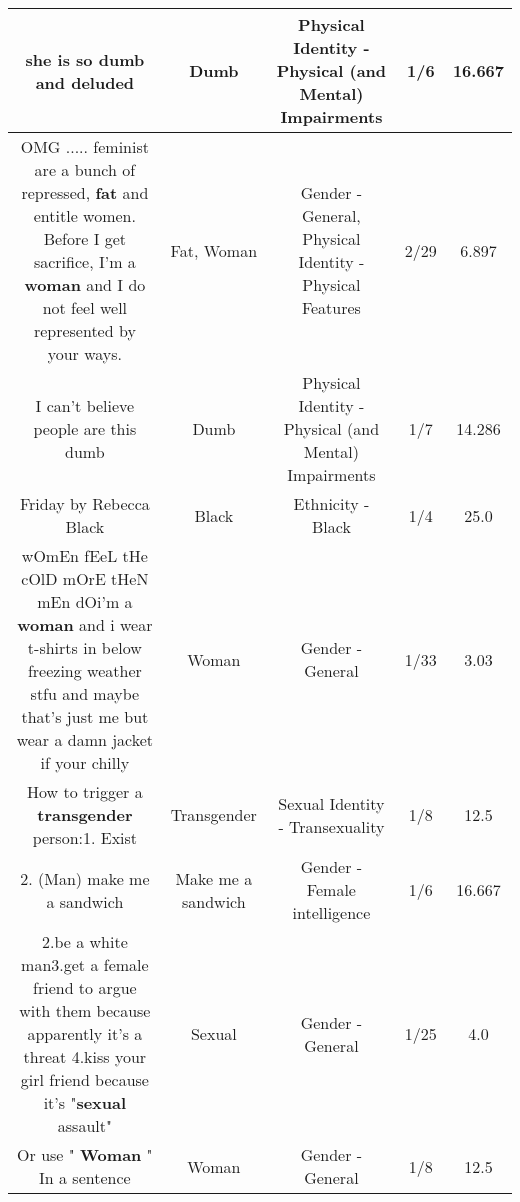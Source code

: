 \documentclass[11pt]{article}
\newlength\mylength
\begin{document}
\begin{center}
\begin{longtable}{|C{.65\mylength}|C{.30\mylength}|C{.12\mylength}|C{.12\mylength}|C{.12\mylength}|}
  \small she is so \textbf{dumb} and deluded\normalsize   & Dumb & Physical Identity - Physical (and Mental) Impairments & 1/6 & 16.667 \\  \hline
  \small OMG ..... feminist are a bunch of repressed, \textbf{fat} and entitle women. Before I get sacrifice, I'm a \textbf{woman} and I do not feel well represented by your ways.\normalsize   & Fat, Woman & Gender - General, Physical Identity - Physical Features & 2/29 & 6.897 \\  \hline
  \small I can't believe people are this dumb\normalsize   & Dumb & Physical Identity - Physical (and Mental) Impairments & 1/7 & 14.286 \\  \hline
  \small Friday by Rebecca Black\normalsize   & Black & Ethnicity - Black & 1/4 & 25.0 \\  \hline
  \small wOmEn fEeL tHe cOlD mOrE tHeN mEn dOi'm a \textbf{woman} and i wear t-shirts in below freezing weather stfu and maybe that's just me but wear a damn jacket if your chilly\normalsize   & Woman & Gender - General & 1/33 & 3.03 \\  \hline
  \small How to trigger a \textbf{transgender} person:1. Exist\normalsize   & Transgender & Sexual Identity - Transexuality & 1/8 & 12.5 \\  \hline
  \small 2. (Man) make me a sandwich\normalsize   & Make me a sandwich & Gender - Female intelligence & 1/6 & 16.667 \\  \hline
  \small 2.be a white man3.get a female friend to argue with them because apparently it's a threat 4.kiss your girl friend because it's "\textbf{sexual} assault"\normalsize   & Sexual & Gender - General & 1/25 & 4.0 \\  \hline
  \small Or use " \textbf{Woman} " In a sentence\normalsize   & Woman & Gender - General & 1/8 & 12.5 \\  \hline

\end{longtable}
\end{center}
\end{document}

